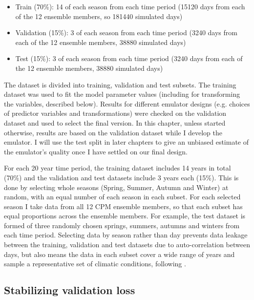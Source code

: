 \begin{itemize}
    \item Train (70\%): 14 of each season from each time period (15120 days from each of the 12 ensemble members, so 181440 simulated days)
    \item Validation (15\%): 3 of each season from each time period (3240 days from each of the 12 ensemble members, 38880 simulated days)
    \item Test (15\%): 3 of each season from each time period (3240 days from each of the 12 ensemble members, 38880 simulated days)
\end{itemize}

The dataset is divided into training, validation and test subsets.
The training dataset was used to fit the model parameter values (including for transforming the variables, described below). Results for different emulator designs (e.g. choices of predictor variables and transformations) were checked on the validation dataset and used to select the final version. In this chapter, unless started otherwise, results are based on the validation dataset while I develop the emulator. I will use the test split in later chapters to give an unbiased estimate of the emulator's quality once I have settled on our final design.

For each 20 year time period, the training dataset includes 14 years in total (70\%) and the validation and test datasets include 3 years each (15\%). This is done by selecting whole seasons (Spring, Summer, Autumn and Winter) at random, with an equal number of each season in each subset. For each selected season I take data from all 12 CPM ensemble members, so that each subset has equal proportions across the ensemble members. For example, the test dataset is formed of three randomly chosen springs, summers, autumns and winters from each time period. Selecting data by season rather than day prevents data leakage between the training, validation and test datasets due to auto-correlation between days, but also means the data in each subset cover a wide range of years and sample a representative set of climatic conditions, following \textcite{schulz2021dlvsnumweather}.

\subsection{Stabilizing validation loss}

